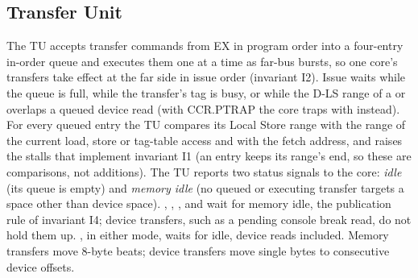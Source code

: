 \subsection{Transfer Unit}
The TU accepts transfer commands from EX in program order into a four-entry in-order queue and executes
them one at a time as far-bus bursts, so one core's transfers take effect at the far side in issue
order (invariant I2). Issue waits while the queue is full, while the transfer's tag is busy, or while
the D-LS range of a  or  overlaps a queued device read (with CCR.PTRAP the core
traps with  instead). For every
queued entry the TU compares its Local Store range with the range of the current load, store or
tag-table access and with the fetch address, and raises the stalls that implement invariant I1 (an
entry keeps its range's end, so these are comparisons, not additions).
The TU reports two status signals to the core: \emph{idle} (its queue is empty) and \emph{memory
idle} (no queued or executing transfer targets a space other than device space). ,
, ,  and  wait for memory idle, the publication rule
of invariant I4; device transfers, such as a pending console break read, do not hold them up.
, in either mode, waits for idle, device reads included. Memory
transfers move 8-byte beats; device transfers move single bytes to consecutive device offsets.

